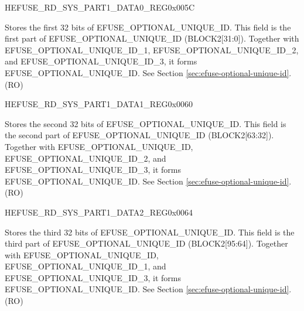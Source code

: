 \begin{register}{H}{EFUSE\_RD\_SYS\_PART1\_DATA0\_REG}{0x{}005C}\label{regdesc:EFUSERDSYSPART1DATA0REG}
%
\regnewline%
\begin{regdesc}\begin{reglist}
\label{fielddesc:EFUSEOPTIONALUNIQUEID}\item [EFUSE\_OPTIONAL\_UNIQUE\_ID] Stores the first 32 bits of EFUSE\_OPTIONAL\_UNIQUE\_ID. This field is the first part of EFUSE\_OPTIONAL\_UNIQUE\_ID (BLOCK2[31:0]). Together with EFUSE\_OPTIONAL\_UNIQUE\_ID\_1, EFUSE\_OPTIONAL\_UNIQUE\_ID\_2, and EFUSE\_OPTIONAL\_UNIQUE\_ID\_3, it forms EFUSE\_OPTIONAL\_UNIQUE\_ID. See Section \ref{sec:efuse-optional-unique-id}. (RO)
\end{reglist}\end{regdesc}
\end{register}


\begin{register}{H}{EFUSE\_RD\_SYS\_PART1\_DATA1\_REG}{0x{}0060}\label{regdesc:EFUSERDSYSPART1DATA1REG}
%
\regnewline%
\begin{regdesc}\begin{reglist}
\label{fielddesc:EFUSEOPTIONALUNIQUEID1}\item [EFUSE\_OPTIONAL\_UNIQUE\_ID\_1] Stores the second 32 bits of EFUSE\_OPTIONAL\_UNIQUE\_ID. This field is the second part of EFUSE\_OPTIONAL\_UNIQUE\_ID (BLOCK2[63:32]). Together with EFUSE\_OPTIONAL\_UNIQUE\_ID, EFUSE\_OPTIONAL\_UNIQUE\_ID\_2, and EFUSE\_OPTIONAL\_UNIQUE\_ID\_3, it forms EFUSE\_OPTIONAL\_UNIQUE\_ID. See Section \ref{sec:efuse-optional-unique-id}. (RO)
\end{reglist}\end{regdesc}
\end{register}


\begin{register}{H}{EFUSE\_RD\_SYS\_PART1\_DATA2\_REG}{0x{}0064}\label{regdesc:EFUSERDSYSPART1DATA2REG}
%
\regnewline%
\begin{regdesc}\begin{reglist}
\label{fielddesc:EFUSEOPTIONALUNIQUEID2}\item [EFUSE\_OPTIONAL\_UNIQUE\_ID\_2] Stores the third 32 bits of EFUSE\_OPTIONAL\_UNIQUE\_ID. This field is the third part of EFUSE\_OPTIONAL\_UNIQUE\_ID (BLOCK2[95:64]). Together with EFUSE\_OPTIONAL\_UNIQUE\_ID, EFUSE\_OPTIONAL\_UNIQUE\_ID\_1, and EFUSE\_OPTIONAL\_UNIQUE\_ID\_3, it forms EFUSE\_OPTIONAL\_UNIQUE\_ID. See Section \ref{sec:efuse-optional-unique-id}. (RO)
\end{reglist}\end{regdesc}
\end{register}


